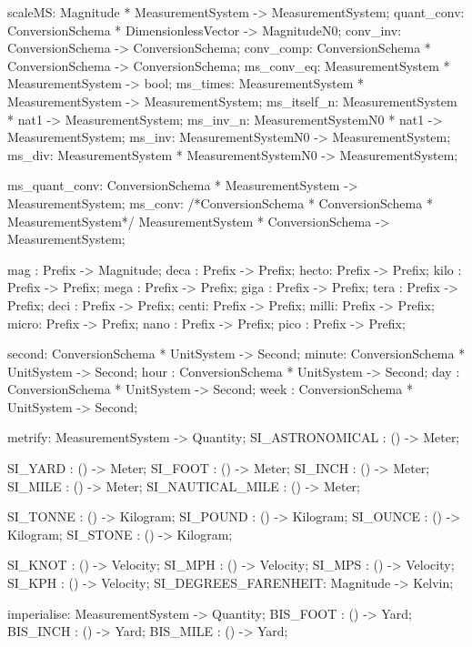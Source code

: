 \documentclass[a4paper]{article}
\begin{document}
\begin{vdm_al}
  scaleMS: Magnitude * MeasurementSystem -> MeasurementSystem;
  quant_conv: ConversionSchema * DimensionlessVector -> MagnitudeN0;
  conv_inv: ConversionSchema -> ConversionSchema;
  conv_comp: ConversionSchema * ConversionSchema -> ConversionSchema;
  ms_conv_eq: MeasurementSystem * MeasurementSystem -> bool;
  ms_times: MeasurementSystem * MeasurementSystem -> MeasurementSystem;
  ms_itself_n: MeasurementSystem * nat1 -> MeasurementSystem;
  ms_inv_n: MeasurementSystemN0 * nat1 -> MeasurementSystem;
  ms_inv: MeasurementSystemN0 -> MeasurementSystem;
  ms_div: MeasurementSystem * MeasurementSystemN0 -> MeasurementSystem;
   
  ms_quant_conv: ConversionSchema * MeasurementSystem -> MeasurementSystem;
  ms_conv: /*ConversionSchema * ConversionSchema * MeasurementSystem*/
       MeasurementSystem * ConversionSchema -> MeasurementSystem;
 
  mag  : Prefix -> Magnitude;
  deca : Prefix -> Prefix;
  hecto: Prefix -> Prefix;
  kilo : Prefix -> Prefix;
  mega : Prefix -> Prefix;
  giga : Prefix -> Prefix;
  tera : Prefix -> Prefix;
  deci : Prefix -> Prefix;
  centi: Prefix -> Prefix;
  milli: Prefix -> Prefix;
  micro: Prefix -> Prefix;
  nano : Prefix -> Prefix;
  pico : Prefix -> Prefix;
  
  second: ConversionSchema * UnitSystem -> Second;
  minute: ConversionSchema * UnitSystem -> Second;
  hour  : ConversionSchema * UnitSystem -> Second;
  day   : ConversionSchema * UnitSystem -> Second;
  week  : ConversionSchema * UnitSystem -> Second;

    metrify: MeasurementSystem -> Quantity;
  SI_ASTRONOMICAL     : () -> Meter;
 
  SI_YARD             : () -> Meter;
  SI_FOOT             : () -> Meter;
  SI_INCH             : () -> Meter;
  SI_MILE             : () -> Meter;
  SI_NAUTICAL_MILE    : () -> Meter;
  
  SI_TONNE            : () -> Kilogram; 
  SI_POUND            : () -> Kilogram;
  SI_OUNCE            : () -> Kilogram;
  SI_STONE            : () -> Kilogram;
  
  SI_KNOT             : () -> Velocity;
  SI_MPH              : () -> Velocity;
  SI_MPS              : () -> Velocity;
  SI_KPH              : () -> Velocity;
  SI_DEGREES_FARENHEIT: Magnitude -> Kelvin;

    imperialise: MeasurementSystem -> Quantity;
  BIS_FOOT         : () -> Yard;
  BIS_INCH         : () -> Yard;
  BIS_MILE         : () -> Yard;
 

\end{vdm_al}
\end{document}
